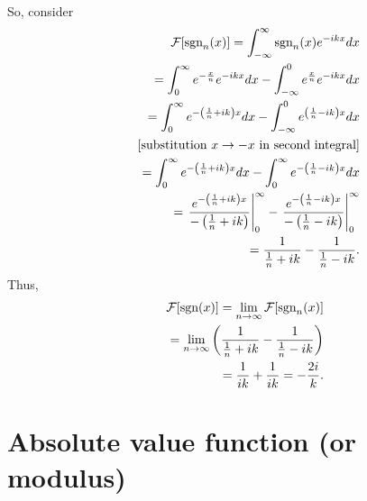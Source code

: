 So, consider
\begin{equation}
\begin{split}
  {\cal F}[\textrm{sgn}_n (x)]= \int_{-\infty}^\infty  \textrm{sgn}_n (x) e^{-i{kx}} dx   \\
\qquad =
\int_{0}^\infty  e^{-\frac{x}{n}} e^{-i{kx}} dx
-
\int_{-\infty}^0  e^{ \frac{x}{n}} e^{-i{kx}} dx
\\
\qquad =
\int_{0}^\infty  e^{-\left(\frac{1}{n}+i{k}\right) x} dx
-
\int_{-\infty}^0  e^{ \left(\frac{1}{n}-i{k}\right) x} dx
\\
\qquad \;
[\textrm{substitution }x \rightarrow -x \textrm{ in second integral}]\\
\qquad =
\int_{0}^\infty  e^{-\left(\frac{1}{n}+i{k}\right) x} dx
-
\int_{0}^\infty  e^{-\left(\frac{1}{n}-i{k}\right) x} dx
\\
\qquad =
\left.  \frac{ e^{-\left(\frac{1}{n}+i{k}\right) x}}{{-\left(\frac{1}{n}+i{k}\right)  }} \right|_{0}^\infty
-
\left.  \frac{ e^{-\left(\frac{1}{n}-i{k}\right) x}}{-\left(\frac{1}{n}-i{k}\right)} \right|_{0}^\infty
\\
\qquad =
  \frac{ 1}{  \frac{1}{n}+i{k} }
-
 \frac{ 1 }{ \frac{1}{n}-i{k} }
.
\end{split}
\label{2011-m-ftsgn1a}
\end{equation}
Thus,
\begin{equation}
\begin{split}
{\cal F}[\textrm{sgn}  (x)] =\lim_{n\rightarrow \infty}  {\cal F}[\textrm{sgn}_n (x)]
\\
\qquad =  \lim_{n\rightarrow \infty}  \left(
  \frac{ 1}{ \frac{1}{n}+i{k}   }
-
 \frac{ 1 }{  \frac{1}{n}-i{k}   }          \right)
\\
\qquad =
  \frac{ 1}{   i{k}  }
+
 \frac{ 1 }{  i{k} }
 =
  -\frac{2i}{ k }
.
\end{split}
\label{2011-m-ftsgn1b}
\end{equation}
\fi




\section{Absolute value function (or modulus)}

